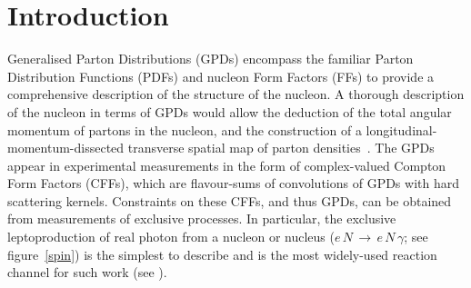 \section{Introduction}
Generalised Parton Distributions (GPDs)
\cite{Mue94,Ji97,Rad97} encompass the familiar Parton
Distribution Functions (PDFs) and nucleon Form Factors (FFs) to provide a
comprehensive description of the structure of the nucleon. A thorough
description of the nucleon in terms of GPDs would allow the deduction
of the total angular momentum of partons in the nucleon, and the
construction of a longitudinal-momentum-dissected transverse spatial map of parton densities~\cite{Bur00}. The GPDs appear in experimental measurements in the form of complex-valued Compton Form Factors (CFFs), which are flavour-sums of convolutions of GPDs with hard scattering kernels. Constraints on these CFFs, and thus GPDs, can be obtained from measurements of exclusive  processes. In particular, the exclusive leptoproduction of  real photon from a nucleon or nucleus  ($e\,N\,\rightarrow\,e\,N\,\gamma$; see figure~\ref{spin}) is the simplest to describe and is the most widely-used reaction channel for such work (see \cite{Air01,Air06,Air08,Air09,Air10,Air10a,Air10b,Air11,Air11a}).

